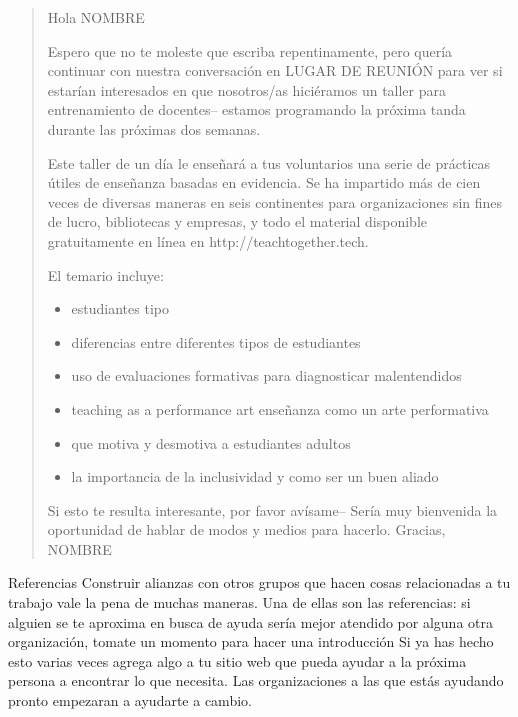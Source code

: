 \begin{quote}

  \noindent
    Hola NOMBRE
 
 Espero que no te moleste que escriba repentinamente,
 pero quería continuar con nuestra conversación en LUGAR DE REUNIÓN
 para ver si estarían interesados en que nosotros/as hiciéramos un taller para entrenamiento de docentes-- estamos programando  la próxima tanda durante las próximas dos semanas.

 Este taller de un día le enseñará a tus voluntarios
 una serie de prácticas útiles de enseñanza basadas en evidencia.
 Se ha impartido más de cien veces de diversas maneras en seis continentes
 para organizaciones sin fines de lucro, bibliotecas y empresas,
 y  todo el material disponible gratuitamente en línea en http://teachtogether.tech.
 
El temario incluye:

  \begin{itemize}
  \item estudiantes tipo
  \item  diferencias entre diferentes tipos de estudiantes 
  \item uso de evaluaciones formativas para diagnosticar malentendidos
  \item teaching as a performance art enseñanza como un arte performativa
  \item que motiva y desmotiva a estudiantes adultos
  \item la importancia de la inclusividad y como ser un buen aliado
  \end{itemize}
  
 Si esto te resulta interesante,
por favor avísame-- Sería muy bienvenida la oportunidad de hablar de modos y medios para hacerlo.
Gracias,
  NOMBRE

\end{quote}

\begin{aside}{Referencias}
Construir alianzas con otros grupos que hacen cosas relacionadas a tu trabajo
vale la pena de muchas maneras.
Una de ellas son las referencias:
si alguien se te aproxima en busca de ayuda sería mejor atendido por alguna otra organización,
tomate un momento para hacer una introducción
Si ya has hecho esto varias veces
agrega algo a tu sitio web que pueda ayudar a la próxima persona a encontrar lo que necesita.
Las organizaciones a las que estás ayudando pronto empezaran a ayudarte a cambio.
\end{aside}

